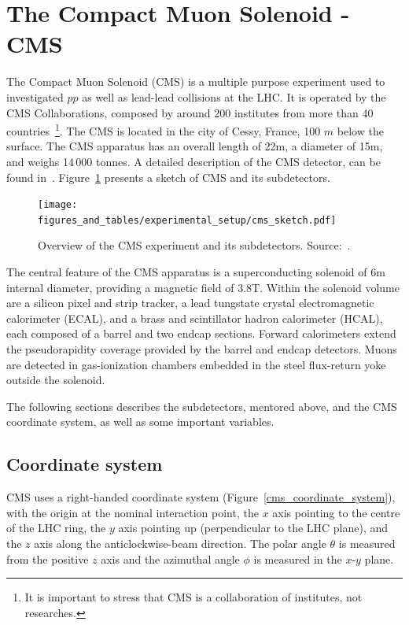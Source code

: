 
\section{The Compact Muon Solenoid - CMS}

The Compact Muon Solenoid (CMS) is a multiple purpose experiment used to investigated $pp$ as well as lead-lead collisions at the LHC. It is operated by the CMS Collaborations, composed by around 200 institutes from more than 40 countries~\footnote{It is important to stress that CMS is a collaboration of institutes, not researches.}. The CMS is located in the city of Cessy, France, 100 $m$ below the surface. The CMS apparatus has an overall length of 22\unit{m}, a diameter of 15\unit{m}, and weighs 14\,000 \unit{tonnes}. A detailed description of the CMS detector, can be found in~\cite{Chatrchyan:2008zzk}. Figure~\ref{cms_sketch} presents a sketch of CMS and its subdetectors.

\begin{figure}[htbp]
    \centering
    \texttt{[image: figures\_and\_tables/experimental\_setup/cms\_sketch.pdf]}
    \caption{Overview of the CMS experiment and its subdetectors. Source:~\cite{Sakuma:2665537}.}
    \label{cms_sketch}
\end{figure}

The central feature of the CMS apparatus is a superconducting solenoid of 6\unit{m} internal diameter, providing a magnetic field of 3.8\unit{T}. Within the solenoid volume are a silicon pixel and strip tracker, a lead tungstate crystal electromagnetic calorimeter (ECAL), and a brass and scintillator hadron calorimeter (HCAL), each composed of a barrel and two endcap sections. Forward calorimeters extend the pseudorapidity coverage provided by the barrel and endcap detectors. Muons are detected in gas-ionization chambers embedded in the steel flux-return yoke outside the solenoid.  

The following sections describes the subdetectors, mentored above, and the CMS coordinate system, as well as some important variables.


\subsection{Coordinate system}

CMS uses a right-handed coordinate system (Figure~\ref{cms_coordinate_system}), with the origin at the nominal interaction point, the $x$ axis pointing to the centre of the LHC ring, the $y$ axis pointing up (perpendicular to the LHC plane), and the $z$ axis along the anticlockwise-beam direction. The polar angle $\theta$ is measured from the positive $z$ axis and the azimuthal angle $\phi$ is measured in the $x$-$y$ plane.

